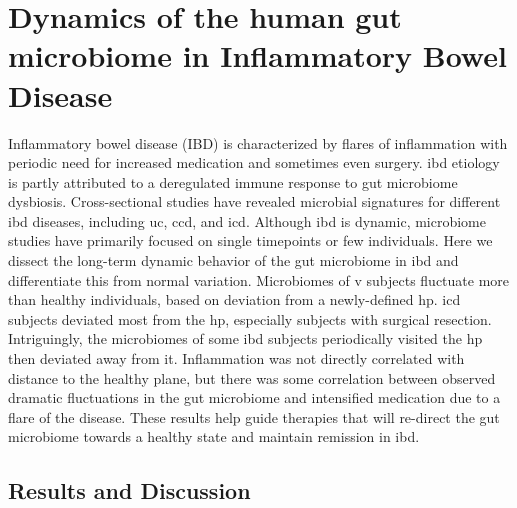 \glsresetall

\section{Dynamics of the human gut microbiome in Inflammatory Bowel 
Disease}\label{section_plane}

Inflammatory bowel disease (IBD) is characterized by flares of inflammation with periodic need for increased medication and sometimes even surgery. \gls{ibd} etiology is partly attributed to a deregulated immune response to gut microbiome dysbiosis. Cross-sectional studies have revealed microbial signatures for different \gls{ibd} diseases, including \gls{uc}, \gls{ccd}, and \gls{icd}. Although \gls{ibd} is dynamic, microbiome studies have primarily focused on single timepoints or few individuals. Here we dissect the long-term dynamic behavior of the gut microbiome in \gls{ibd} and differentiate this from normal variation. Microbiomes of v subjects fluctuate more than healthy individuals, based on deviation from a newly-defined \gls{hp}. \Gls{icd} subjects deviated most from the \gls{hp}, especially subjects with surgical resection. Intriguingly, the microbiomes of some \gls{ibd} subjects periodically visited the \gls{hp} then deviated away from it. Inflammation was not directly correlated with distance to the healthy plane, but there was some correlation between observed dramatic fluctuations in the gut microbiome and intensified medication due to a flare of the disease. These results help guide therapies that will re-direct the gut microbiome towards a healthy state and maintain remission in \gls{ibd}.

\subsection{Results and Discussion}

